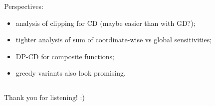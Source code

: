 \documentclass[notheorems]{beamer}
\begin{document}
\begin{frame}
  Perspectives:
  \begin{itemize}
  \item analysis of clipping for CD (maybe easier than with GD?);
  \item tighter analysis of sum of coordinate-wise vs global sensitivities;
  \item DP-CD for composite functions;
  \item greedy variants also look promising.
  \end{itemize}
\end{frame}

\subsection{}

\begin{frame}
  Thank you for listening! :)
\end{frame}
\end{document}
